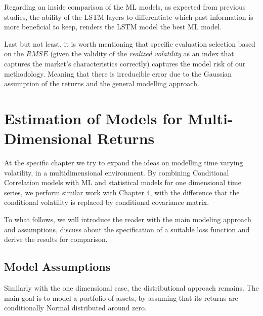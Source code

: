 \documentclass[a4paper, oneside]{discothesis}
\begin{document}
Regarding an inside comparison of the ML models, as expected from previous studies, the ability of the LSTM layers to differentiate which past information is more beneficial to keep, renders the LSTM model the best ML model.

Last but not least, it is worth mentioning that specific evaluation selection based on the $RMSE$ (given the validity of the \textit{realized volatility} as an index that captures the market's characteristics correctly) captures the model risk of our methodology. Meaning that there is irreducible error due to the Gaussian assumption of the returns and the general modelling approach.





\chapter{Estimation of Models for Multi-Dimensional Returns}

At the specific chapter we try to expand the ideas on modelling time varying volatility, in a multidimensional environment. By combining Conditional Correlation models with ML and statistical models for one dimensional time series, we perform similar work with Chapter 4, with the difference that the conditional volatility is replaced by conditional covariance matrix.

To what follows, we will introduce the reader with the main modeling approach and assumptions, discuss about the specification of a suitable loss function and derive the results for comparison.


\section{Model Assumptions}

Similarly with the one dimensional case, the distributional approach remains. The main goal is to model a portfolio of assets, by assuming that its returns are conditionally Normal distributed around zero.
\end{document}
